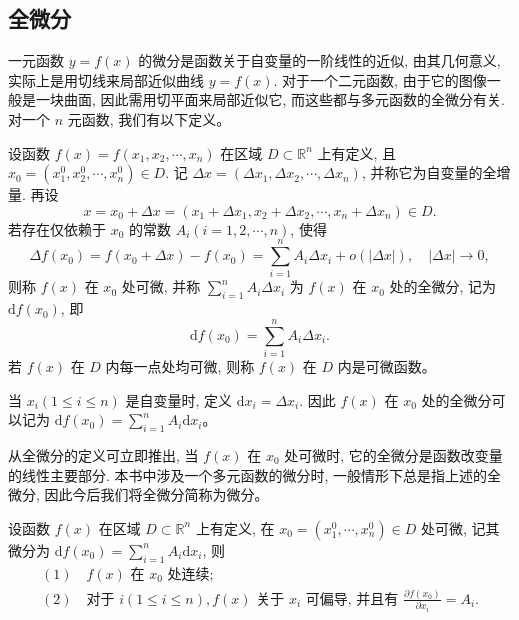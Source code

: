 \documentclass[12pt,fontset=fandol]{ctexart}
\begin{document}
\subsection{全微分}

一元函数 $y=f(x)$ 的微分是函数关于自变量的一阶线性的近似, 由其几何意义, 实际上是用切线来局部近似曲线 $y=f(x)$. 对于一个二元函数, 由于它的图像一般是一块曲面, 因此需用切平面来局部近似它, 而这些都与多元函数的全微分有关. 对一个 $n$ 元函数, 我们有以下定义。

\begin{definition}\label{course-definition-14-1-3}\quad 设函数 $f(x)=f(x_1,x_2,\cdots,x_n)$ 在区域 $D\subset\mathbb R^n$ 上有定义, 且 $x_0=(x_1^0,x_2^0,\cdots,x_n^0)\in D$. 记 $\Delta x=(\Delta x_1,\Delta x_2,\cdots,\Delta x_n)$, 并称它为自变量的全增量. 再设
\[
  x=x_0+\Delta x=(x_1+\Delta x_1,x_2+\Delta x_2,\cdots,x_n+\Delta x_n)\in D.
\]
若存在仅依赖于 $x_0$ 的常数 $A_i(i=1,2,\cdots,n)$, 使得
\[
  \Delta f(x_0)=f(x_0+\Delta x)-f(x_0)
  =\sum_{i=1}^n A_i\Delta x_i+o(|\Delta x|),\quad |\Delta x|\to0,
\]
则称 $f(x)$ 在 $x_0$ 处可微, 并称 $\sum\limits_{i=1}^n A_i\Delta x_i$ 为 $f(x)$ 在 $x_0$ 处的全微分, 记为 $\mathrm df(x_0)$, 即
\[
  \mathrm df(x_0)=\sum_{i=1}^n A_i\Delta x_i.
\]
若 $f(x)$ 在 $D$ 内每一点处均可微, 则称 $f(x)$ 在 $D$ 内是可微函数。

当 $x_i(1\leqslant i\leqslant n)$ 是自变量时, 定义 $\mathrm dx_i=\Delta x_i$. 因此 $f(x)$ 在 $x_0$ 处的全微分可以记为 $\mathrm df(x_0)=\sum\limits_{i=1}^n A_i\mathrm dx_i$。

从全微分的定义可立即推出, 当 $f(x)$ 在 $x_0$ 处可微时, 它的全微分是函数改变量的线性主要部分. 本书中涉及一个多元函数的微分时, 一般情形下总是指上述的全微分, 因此今后我们将全微分简称为微分。

\end{definition}
\begin{theorem}\label{course-theorem-14-1-1}\quad 设函数 $f(x)$ 在区域 $D\subset\mathbb R^n$ 上有定义, 在 $x_0=(x_1^0,\cdots,x_n^0)\in D$ 处可微, 记其微分为 $\mathrm df(x_0)=\sum\limits_{i=1}^n A_i\mathrm dx_i$, 则
\[
\begin{gathered}
  (1)\quad f(x)\text{ 在 }x_0\text{ 处连续};\\
  (2)\quad \text{对于 } i(1\leqslant i\leqslant n), f(x)\text{ 关于 }x_i\text{ 可偏导, 并且有 }
  \frac{\partial f(x_0)}{\partial x_i}=A_i.
\end{gathered}
\]

\end{theorem}
\end{document}
